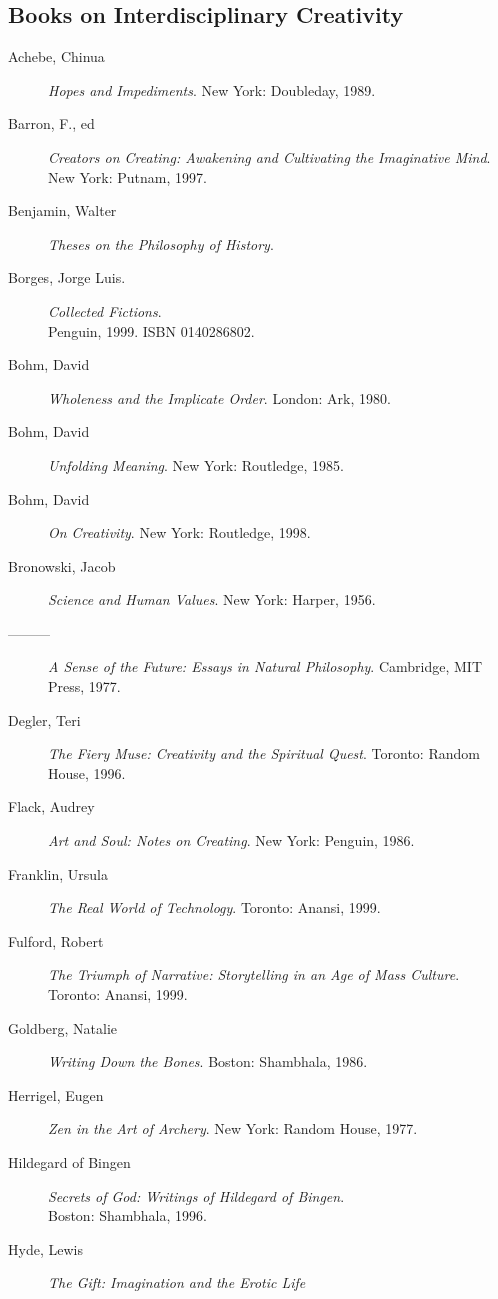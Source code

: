 \documentclass[letterpaper,10pt,headsepline]{scrreprt}
\begin{document}
\subsection{Books on Interdisciplinary Creativity}
\begin{description}
\item [Achebe, Chinua] \textit{Hopes and Impediments}. New York:
  Doubleday, 1989.
\item [Barron, F., ed] \textit{Creators on Creating: Awakening and
    Cultivating the Imaginative Mind}. New York: Putnam, 1997.
\item [Benjamin, Walter] \textit{Theses on the Philosophy of History}.
\item [Borges, Jorge Luis.] \textit{Collected Fictions}. \\Penguin,
  1999. \textsc{ISBN 0140286802}.
\item [Bohm, David] \textit{Wholeness and the Implicate Order}.
  London: Ark, 1980.
\item [Bohm, David] \textit{Unfolding Meaning}. New York: Routledge,
  1985.
\item [Bohm, David] \textit{On Creativity}. New York: Routledge, 1998.
\item [Bronowski, Jacob] \textit{Science and Human Values}. New York:
  Harper, 1956.
\item [---------] \textit{A Sense of the Future: Essays in Natural
    Philosophy}. Cambridge, MIT Press, 1977.
\item [Degler, Teri] \textit{The Fiery Muse: Creativity and the
    Spiritual Quest}. Toronto: Random House, 1996.
\item [Flack, Audrey] \textit{Art and Soul: Notes on Creating}. New
  York: Penguin, 1986.
\item [Franklin, Ursula] \textit{The Real World of Technology}.
  Toronto: Anansi, 1999.
\item [Fulford, Robert] \textit{The Triumph of Narrative: Storytelling
    in an Age of Mass Culture}. Toronto: Anansi, 1999.
\item [Goldberg, Natalie] \textit{Writing Down the Bones}. Boston:
  Shambhala, 1986.
\item [Herrigel, Eugen] \textit{Zen in the Art of Archery}. New York:
  Random House, 1977.
\item [Hildegard of Bingen] \textit{Secrets of God: Writings of
    Hildegard of Bingen}.\\ Boston: Shambhala, 1996.
\item [Hyde, Lewis] \textit{The Gift: Imagination and the Erotic Life
}
\end{description}
\end{document}
